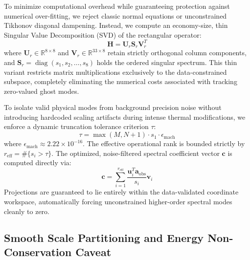 \documentclass[11pt,a4paper]{article}
\begin{document}
To minimize computational overhead while guaranteeing protection against numerical over-fitting, we reject classic normal equations or unconstrained Tikhonov diagonal dampening. Instead, we compute an economy-size, thin Singular Value Decomposition (SVD) of the rectangular operator:
\begin{equation}
\mathbf{H} = \mathbf{U}_r \mathbf{S}_r \mathbf{V}_r^T
\label{eq:thin_svd}
\end{equation}
where $\mathbf{U}_r \in \mathbb{R}^{8 \times 8}$ and $\mathbf{V}_r \in \mathbb{R}^{33 \times 8}$ retain strictly orthogonal column components, and $\mathbf{S}_r = \operatorname{diag}(s_1, s_2, \ldots, s_8)$ holds the ordered singular spectrum. This thin variant restricts matrix multiplications exclusively to the data-constrained subspace, completely eliminating the numerical costs associated with tracking zero-valued ghost modes.

To isolate valid physical modes from background precision noise without introducing hardcoded scaling artifacts during intense thermal modifications, we enforce a dynamic truncation tolerance criterion $\tau$:
\begin{equation}
\tau = \max\left(M, N+1\right) \cdot s_1 \cdot \epsilon_{\mathrm{mach}}
\label{eq:dynamic_tolerance}
\end{equation}
where $\epsilon_{\mathrm{mach}} \approx 2.22 \times 10^{-16}$. The effective operational rank is bounded strictly by $r_{\mathrm{eff}} = \#\{s_i > \tau\}$. The optimized, noise-filtered spectral coefficient vector $\mathbf{c}$ is computed directly via:
\begin{equation}
\mathbf{c} = \sum_{i=1}^{r_{\mathrm{eff}}} \frac{\mathbf{u}_i^T \mathbf{a}_{\mathrm{obs}}}{s_i} \mathbf{v}_i
\label{eq:svd_reconstruction}
\end{equation}
Projections are guaranteed to lie entirely within the data-validated coordinate workspace, automatically forcing unconstrained higher-order spectral modes cleanly to zero.

\subsection{Smooth Scale Partitioning and Energy Non-Conservation Caveat}
\label{sec:methods:partition}
\end{document}
